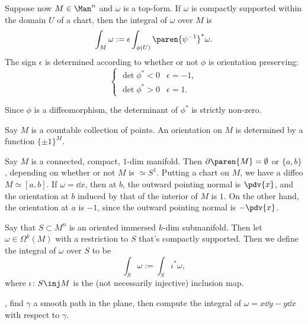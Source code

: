 Suppose now $M \in \Man^n$ and $\omega$ is a top-form. If $\omega$ is compactly supported within the domain $U$ of a chart, then the integral of $\omega$ over $M$ is 
\begin{equation*}
    \int_M \omega := \epsilon \int_{\phi(U)} \paren{\psi^{-1}}^* \omega.
\end{equation*}
The sign $\epsilon$ is determined according to whether or not $\phi$ is orientation preserving:
\begin{equation*}
    \begin{cases}
        \det \phi^* < 0 & \epsilon = -1,\\
        \det \phi^* > 0 & \epsilon = 1.
    \end{cases}
\end{equation*}

Since $\phi$ is a diffeomorphism, the determinant of $\phi^*$ is strictly non-zero.

\begin{ex}
    \label{ex:zero_dim_manifolds}
    Say $M$ is a countable collection of points. An orientation on $M$ is determined by a function $\{\pm 1\}^M$.

    Say $M$ is a connected, compact, $1$-dim manifold. Then $\partial\paren{M} = \emptyset$ or $\{a, b\}$, depending on whether or not $M$ is $\simeq S^1$. Putting a chart on $M$, we have a diffeo $M \simeq [a,b]$. If $\omega = \dd{x}$, then at $b$, the outward pointing normal is $\pdv{x}$, and the orientation at $b$ induced by that of the interior of $M$ is $1$. On the other hand, the orientation at $a$ is $-1$, since the outward pointing normal is $-\pdv{x}$.
\end{ex}

Say that $S \subset M^n$ is an oriented immersed $k$-dim submanifold. Then let $\omega \in \Omega^k(M)$ with a restriction to $S$ that's compactly supported. Then we define the integral of $\omega$ over $S$ to be 
\begin{equation*}
    \int_S \omega := \int_S \iota^* \omega,
\end{equation*}
where $\iota \colon S \inj M$ is the (not necessarily  injective) inclusion map.

\begin{ex}
    \label{ex:path_integrals}
    \TODO, find $\gamma$ a smooth path in the plane, then compute the integral of $\omega = x \dd{y} - y  \dd{x}$ with respect to $\gamma$.
\end{ex}

